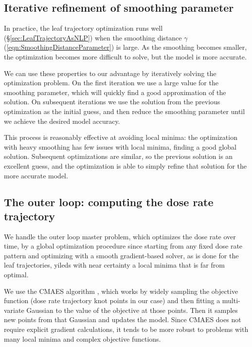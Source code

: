 \documentclass[12pt]{article}
\begin{document}
\subsection{Iterative refinement of smoothing parameter}

In practice, the leaf trajectory optimization runs well (\S\ref{sec:LeafTrajectoryAsNLP})
when the smoothing distance $\gamma$ (\ref{eqn:SmoothingDistanceParameter}) is large.
As the smoothing becomes smaller, the optimization becomes more difficult to solve,
but the model is more accurate.

We can use these properties to our advantage by iteratively solving the optimization problem.
On the first iteration we use a large value for the smoothing parameter,
which will quickly find a good approximation of the solution.
On subsequent iterations we use the solution from the previous optimization as the initial guess,
and then reduce the smoothing parameter until we achieve the desired model accuracy.

This process is reasonably effective at avoiding local minima:
the optimization with heavy smoothing has few issues with local minima, finding a good global solution.
Subsequent optimizations are similar, so the previous solution is an excellent guess,
and the optimization is able to simply refine that solution for the more accurate model.


\subsection{The outer loop: computing the dose rate trajectory}
We handle the outer loop master problem, which optimizes the dose rate over time, by a
global optimization procedure since starting from any fixed dose rate pattern and optimizing with
a smooth gradient-based solver, as is done for the leaf trajectories, yileds with near certainty
a local minima that is far from optimal.

We use the CMAES algorithm \cite{Hansen2001}, which
works by widely sampling the objective function (dose rate trajectory knot points in our case) and then fitting a multi-variate Gaussian to the value of the objective at those points.
Then it samples new points from that Gaussian and updates the model.
Since CMAES does not require explicit gradient calculations, it tends to be more robust to problems
with many local minima and complex objective functions.
\end{document}
